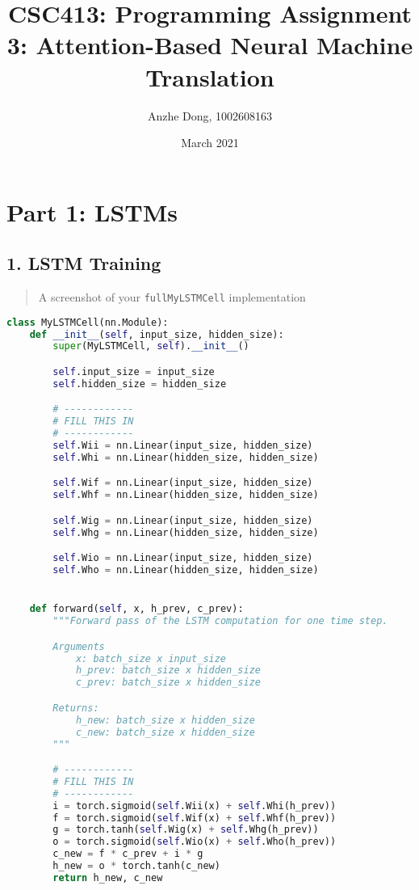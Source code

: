 \documentclass{article}
\title{CSC413: Programming Assignment 3: Attention-Based Neural Machine Translation}
\author{Anzhe Dong, 1002608163}
\date{March 2021}
\begin{document}
\maketitle

\section*{Part 1: LSTMs}

\subsection*{1. LSTM Training}

\begin{quote}
A screenshot of your \texttt{fullMyLSTMCell} implementation
\end{quote}

\begin{lstlisting}[language=Python]
class MyLSTMCell(nn.Module):
    def __init__(self, input_size, hidden_size):
        super(MyLSTMCell, self).__init__()

        self.input_size = input_size
        self.hidden_size = hidden_size

        # ------------
        # FILL THIS IN
        # ------------
        self.Wii = nn.Linear(input_size, hidden_size)
        self.Whi = nn.Linear(hidden_size, hidden_size)

        self.Wif = nn.Linear(input_size, hidden_size)
        self.Whf = nn.Linear(hidden_size, hidden_size)

        self.Wig = nn.Linear(input_size, hidden_size)
        self.Whg = nn.Linear(hidden_size, hidden_size)

        self.Wio = nn.Linear(input_size, hidden_size)
        self.Who = nn.Linear(hidden_size, hidden_size)


    def forward(self, x, h_prev, c_prev):
        """Forward pass of the LSTM computation for one time step.

        Arguments
            x: batch_size x input_size
            h_prev: batch_size x hidden_size
            c_prev: batch_size x hidden_size

        Returns:
            h_new: batch_size x hidden_size
            c_new: batch_size x hidden_size
        """

        # ------------
        # FILL THIS IN
        # ------------
        i = torch.sigmoid(self.Wii(x) + self.Whi(h_prev))
        f = torch.sigmoid(self.Wif(x) + self.Whf(h_prev))
        g = torch.tanh(self.Wig(x) + self.Whg(h_prev))
        o = torch.sigmoid(self.Wio(x) + self.Who(h_prev))
        c_new = f * c_prev + i * g
        h_new = o * torch.tanh(c_new)
        return h_new, c_new
\end{lstlisting}
\end{document}
